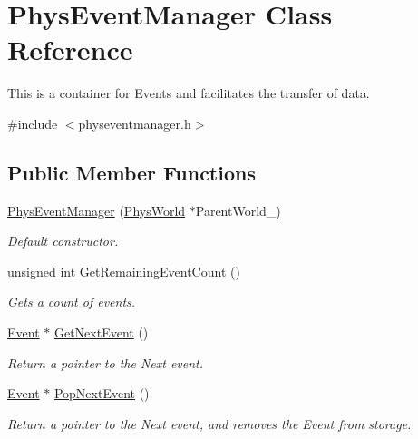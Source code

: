 \hypertarget{classPhysEventManager}{
\section{PhysEventManager Class Reference}
\label{d5/dd7/classPhysEventManager}
}


This is a container for Events and facilitates the transfer of data.  




{\ttfamily \#include $<$physeventmanager.h$>$}

\subsection*{Public Member Functions}
\begin{DoxyCompactItemize}
\item 
\hyperlink{classPhysEventManager_a1355f36d99de303cec6f3b27cadaa9ff}{PhysEventManager} (\hyperlink{classPhysWorld}{PhysWorld} $\ast$ParentWorld\_\-)
\begin{DoxyCompactList}\small\item\em Default constructor. \item\end{DoxyCompactList}\item 
unsigned int \hyperlink{classPhysEventManager_ab14d238e7abe9919be8e2d9eef388b64}{GetRemainingEventCount} ()
\begin{DoxyCompactList}\small\item\em Gets a count of events. \item\end{DoxyCompactList}\item 
\hyperlink{classphys_1_1Event}{Event} $\ast$ \hyperlink{classPhysEventManager_a1ab0da9e37f43c2c0d5af1dae26dcaf2}{GetNextEvent} ()
\begin{DoxyCompactList}\small\item\em Return a pointer to the Next event. \item\end{DoxyCompactList}\item 
\hyperlink{classphys_1_1Event}{Event} $\ast$ \hyperlink{classPhysEventManager_a23091695829acad90c499f6724fe048c}{PopNextEvent} ()
\begin{DoxyCompactList}\small\item\em Return a pointer to the Next event, and removes the Event from storage. \item\end{DoxyCompactList}\item 

\end{DoxyCompactItemize}
